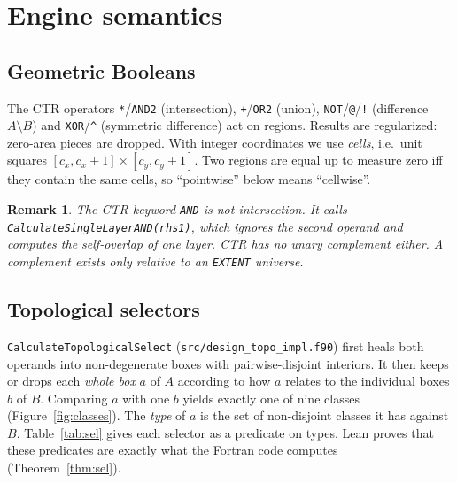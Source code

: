 \documentclass[11pt]{article}
\newtheorem{remark}{Remark}
\newcommand{\op}[1]{\texttt{#1}}
\begin{document}
\section{Engine semantics}\label{sec:sem}
\subsection{Geometric Booleans}
The CTR operators \op{*}/\op{AND2} (intersection), \op{+}/\op{OR2} (union), \op{NOT}/\op{@}/\op{!} (difference $A\setminus B$) and \op{XOR}/\op{\^{}} (symmetric difference) act on regions. Results are regularized: zero-area pieces are dropped. With integer coordinates we use \emph{cells}, i.e.\ unit squares $[c_x,c_x{+}1]\times[c_y,c_y{+}1]$. Two regions are equal up to measure zero iff they contain the same cells, so ``pointwise'' below means ``cellwise''.

\begin{remark}
The CTR keyword \op{AND} is \emph{not} intersection. It calls \texttt{CalculateSingleLayerAND(rhs1)}, which ignores the second operand and computes the self-overlap of one layer. CTR has no unary complement either. A complement exists only relative to an \op{EXTENT} universe.
\end{remark}

\subsection{Topological selectors}
\texttt{CalculateTopologicalSelect} (\texttt{src/design\_topo\_impl.f90}) first heals both operands into non-degenerate boxes with pairwise-disjoint interiors. It then keeps or drops each \emph{whole box} $a$ of $A$ according to how $a$ relates to the individual boxes $b$ of $B$. Comparing $a$ with one $b$ yields exactly one of nine classes (Figure~\ref{fig:classes}). The \emph{type} of $a$ is the set of non-disjoint classes it has against $B$. Table~\ref{tab:sel} gives each selector as a predicate on types. Lean proves that these predicates are exactly what the Fortran code computes (Theorem~\ref{thm:sel}).
\end{document}
